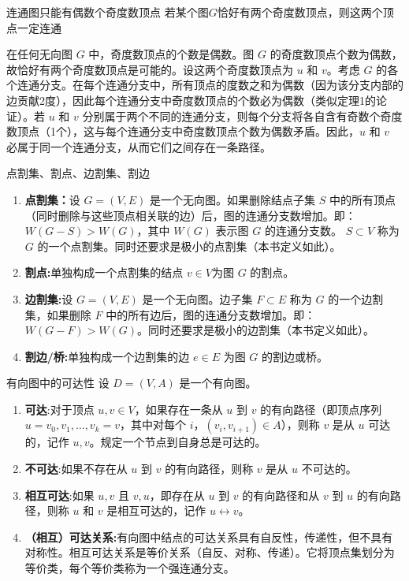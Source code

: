 \documentclass[lang=cn,11pt]{elegantbook}
\begin{document}
\begin{theorem}{连通图只能有偶数个奇度数顶点}
若某个图$G$恰好有两个奇度数顶点，则这两个顶点一定连通
\end{theorem}
在任何无向图 $G$ 中，奇度数顶点的个数是偶数。图 $G$ 的奇度数顶点个数为偶数，故恰好有两个奇度数顶点是可能的。设这两个奇度数顶点为 $u$ 和 $v$。考虑 $G$ 的各个连通分支。在每个连通分支中，所有顶点的度数之和为偶数（因为该分支内部的边贡献2度），因此每个连通分支中奇度数顶点的个数必为偶数（类似定理1的论证）。若 $u$ 和 $v$ 分别属于两个不同的连通分支，则每个分支将各自含有奇数个奇度数顶点（1个），这与每个连通分支中奇度数顶点个数为偶数矛盾。因此，$u$ 和 $v$ 必属于同一个连通分支，从而它们之间存在一条路径。
\begin{definition}{点割集、割点、边割集、割边}
\begin{enumerate}
    \item\textbf{点割集：}设 $G = (V, E)$ 是一个无向图。如果删除结点子集 $S$ 中的所有顶点（同时删除与这些顶点相关联的边）后，图的连通分支数增加。即：$W(G - S) > W(G)$，其中 $W(G)$ 表示图 $G$ 的连通分支数。 $S \subset V$ 称为 $G$ 的一个点割集。同时还要求是极小的点割集（本书定义如此）。
    \item \textbf{割点:}单独构成一个点割集的结点 $v \in V$为图 $G$ 的割点。
    \item \textbf{边割集:}设 $G = (V, E)$ 是一个无向图。边子集 $F \subset E$ 称为 $G$ 的一个边割集，如果删除 $F$ 中的所有边后，图的连通分支数增加。即：$W(G - F) > W(G)$。同时还要求是极小的边割集（本书定义如此）。
\item\textbf{割边/桥:}单独构成一个边割集的边 $e\in E$ 为图 $G$ 的割边或桥。
\end{enumerate}
\end{definition}
\begin{definition}{有向图中的可达性}
设 $D = (V, A)$ 是一个有向图。
\begin{enumerate}
\item\textbf{可达}:对于顶点 $u, v \in V$，如果存在一条从 $u$ 到 $v$ 的有向路径（即顶点序列 $u = v_0, v_1, \ldots, v_k = v$，其中对每个 $i$，$(v_i, v_{i+1}) \in A$），则称 $v$ 是从 $u$ 可达的，记作 $u , v$。规定一个节点到自身总是可达的。
\item\textbf{不可达}:如果不存在从 $u$ 到 $v$ 的有向路径，则称 $v$ 是从 $u$ 不可达的。
\item\textbf{相互可达}:如果 $u , v$ 且 $v , u$，即存在从 $u$ 到 $v$ 的有向路径和从 $v$ 到 $u$ 的有向路径，则称 $u$ 和 $v$ 是相互可达的，记作 $u \leftrightarrow v$。
\item\textbf{（相互）可达关系:}有向图中结点的可达关系具有自反性，传递性，但不具有对称性。相互可达关系是等价关系（自反、对称、传递）。它将顶点集划分为等价类，每个等价类称为一个强连通分支。
\end{enumerate}
\end{definition}
\end{document}
